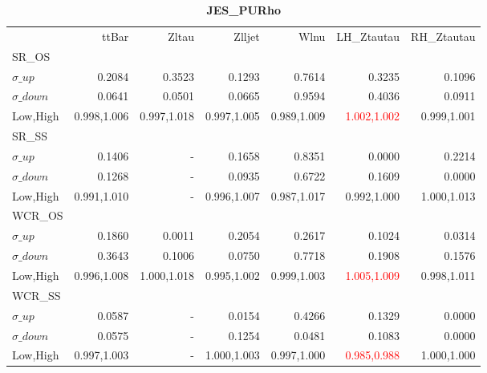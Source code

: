 \documentclass[11pt,oneside,a4paper]{article}
\begin{document}
\begin{table}
\caption{\bf{JES\_PURho}}
\centering
\begin{tabular}{lrrrrrr}
& ttBar & Zltau & Zlljet & Wlnu & LH\_Ztautau & RH\_Ztautau \\

SR\_OS &  &  &  &  &  &  \\
$\sigma\_up$ & 0.2084 & 0.3523 & 0.1293 & 0.7614 & 0.3235 & 0.1096 \\
$\sigma\_down$ & 0.0641 & 0.0501 & 0.0665 & 0.9594 & 0.4036 & 0.0911 \\
Low,High & 0.998,1.006 & 0.997,1.018 & 0.997,1.005 & 0.989,1.009 & \textcolor{red}{1.002,1.002} & 0.999,1.001 \\

\hline
SR\_SS &  &  &  &  &  &  \\
$\sigma\_up$ & 0.1406 & - & 0.1658 & 0.8351 & 0.0000 & 0.2214 \\
$\sigma\_down$ & 0.1268 & - & 0.0935 & 0.6722 & 0.1609 & 0.0000 \\
Low,High & 0.991,1.010 & - & 0.996,1.007 & 0.987,1.017 & 0.992,1.000 & 1.000,1.013 \\

\hline
WCR\_OS &  &  &  &  &  &  \\
$\sigma\_up$ & 0.1860 & 0.0011 & 0.2054 & 0.2617 & 0.1024 & 0.0314 \\
$\sigma\_down$ & 0.3643 & 0.1006 & 0.0750 & 0.7718 & 0.1908 & 0.1576 \\
Low,High & 0.996,1.008 & 1.000,1.018 & 0.995,1.002 & 0.999,1.003 & \textcolor{red}{1.005,1.009} & 0.998,1.011 \\

\hline
WCR\_SS &  &  &  &  &  &  \\
$\sigma\_up$ & 0.0587 & - & 0.0154 & 0.4266 & 0.1329 & 0.0000 \\
$\sigma\_down$ & 0.0575 & - & 0.1254 & 0.0481 & 0.1083 & 0.0000 \\
Low,High & 0.997,1.003 & - & 1.000,1.003 & 0.997,1.000 & \textcolor{red}{0.985,0.988} & 1.000,1.000 \\

\end{tabular}
\end{table}
\end{document}
